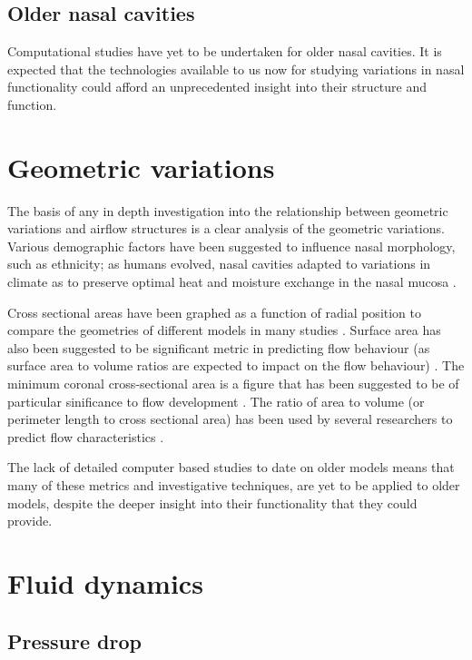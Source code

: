 \subsection*{Older nasal cavities}
Computational studies have yet to be undertaken for older nasal cavities. It is expected that the technologies available to us now for studying variations in nasal functionality could afford an unprecedented insight into their structure and function.

\section{Geometric variations}
The basis of any in depth investigation into the relationship between geometric variations and airflow structures is a clear analysis of the geometric variations. Various demographic factors have been suggested to influence nasal morphology, such as ethnicity; as humans evolved, nasal cavities adapted to variations in climate as to preserve optimal heat and moisture exchange in the nasal mucosa \cite{Davies1932, Thomson1923, Weiner1954, Churchill2004, Noback2011}.

Cross sectional areas have been graphed as a function of radial position to compare the geometries of different models in many studies \cite{Xi2012, Zhu2011, Lindemann2008, Garcia2007}. Surface area has also been suggested to be significant metric in predicting flow behaviour (as surface area to volume ratios are expected to impact on the flow behaviour) \cite{Xi2012, Garcia2007}. The minimum coronal cross-sectional area is a figure that has been suggested to be of particular sinificance to flow development \cite{Lindemann2008}. The ratio of area to volume (or perimeter length to cross sectional area) has been used by several researchers to predict flow characteristics \cite{Xi2012, Garcia2007}.

The lack of detailed computer based studies to date on older models means that many of these metrics and investigative techniques, are yet to be applied to older models, despite the deeper insight into their functionality that they could provide.

\section{Fluid dynamics}


\subsection{Pressure drop}

